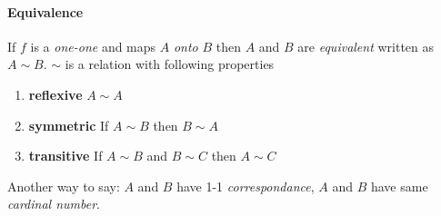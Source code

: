 \documentclass{article}
\begin{document}
	\paragraph{Equivalence} If $f$ is a \textit{one-one} and maps $A$ \textit{onto} $B$ then $A$ and $B$ are \textit{equivalent} written as $A \sim B$. $\sim$ is a relation with following properties
	\begin{enumerate}
		\item \textbf{reflexive} $A \sim A$
		\item \textbf{symmetric} If $A \sim B$ then $B \sim A$
		\item \textbf{transitive} If $A \sim B$ and $B \sim C$ then $A \sim C$
	\end{enumerate}
	Another way to say: $A$ and $B$ have 1-1 \textit{correspondance}, $A$ and $B$ have same \textit{cardinal number}.
\end{document}
